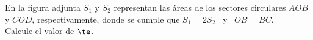 En la figura adjunta $S_1$ y $S_2$ representan las \'areas  de los sectores circulares $AOB$ y $COD$, respectivamente, donde se cumple que $ S_1=2S_2$ \,  y \, $OB=BC$.\\ Calcule el valor de  $ \te $.
\begin{center}
\end{center}

